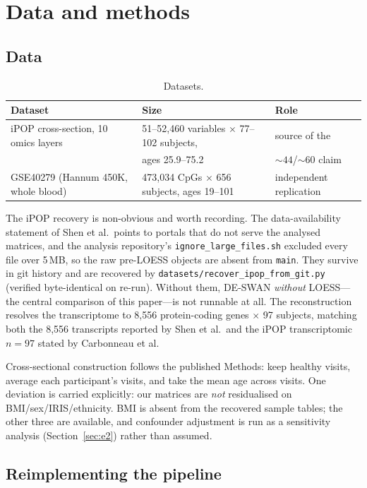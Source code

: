 \documentclass{article}
\begin{document}
\section{Data and methods}

\subsection{Data}

\begin{table}[h]
\centering
\caption{Datasets.}
\begin{tabular}{lll}
\toprule
Dataset & Size & Role \\
\midrule
iPOP cross-section, 10 omics layers & 51--52{,}460 variables $\times$ 77--102 subjects, & source of the \\
 & ages 25.9--75.2 & ${\sim}44$/${\sim}60$ claim \\
GSE40279 (Hannum 450K, whole blood) & 473{,}034 CpGs $\times$ 656 subjects, ages 19--101 & independent replication \\
\bottomrule
\end{tabular}
\end{table}

The iPOP recovery is non-obvious and worth recording. The data-availability statement of Shen et al.\ points to portals that do not serve the analysed matrices, and the analysis repository's \texttt{ignore\_large\_files.sh} excluded every file over 5\,MB, so the raw pre-LOESS objects are absent from \texttt{main}. They survive in git history and are recovered by \texttt{datasets/recover\_ipop\_from\_git.py} (verified byte-identical on re-run). Without them, DE-SWAN \emph{without} LOESS---the central comparison of this paper---is not runnable at all. The reconstruction resolves the transcriptome to 8{,}556 protein-coding genes $\times$ 97 subjects, matching both the 8{,}556 transcripts reported by Shen et al.\ and the iPOP transcriptomic $n=97$ stated by Carbonneau et al.

Cross-sectional construction follows the published Methods: keep healthy visits, average each participant's visits, and take the mean age across visits. One deviation is carried explicitly: our matrices are \emph{not} residualised on BMI/sex/IRIS/ethnicity. BMI is absent from the recovered sample tables; the other three are available, and confounder adjustment is run as a sensitivity analysis (Section~\ref{sec:e2}) rather than assumed.

\subsection{Reimplementing the pipeline}
\end{document}
